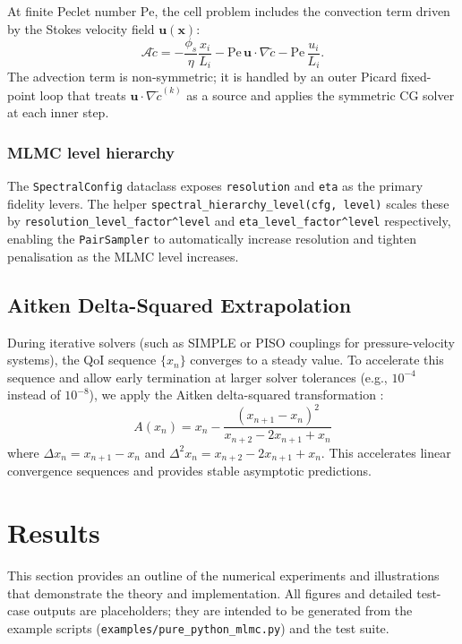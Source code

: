 \documentclass[preprint,12pt]{elsarticle}
\newcommand{\x}{\mathbf{x}}
\newcommand{\bfu}{\mathbf{u}}
\begin{document}
At finite Peclet number $\mathrm{Pe}$, the cell problem includes the
convection term driven by the Stokes velocity field $\bfu(\x)$:
\begin{equation}
  \mathcal{A}\tilde{c} = -\frac{\phi_s}{\eta}\frac{x_i}{L_i}
    - \mathrm{Pe}\,\bfu\cdot\nabla\tilde{c}
    - \mathrm{Pe}\,\frac{u_i}{L_i}.
\end{equation}
The advection term is non-symmetric; it is handled by an outer Picard
fixed-point loop that treats $\bfu\cdot\nabla\tilde{c}^{(k)}$ as a source
and applies the symmetric CG solver at each inner step.

\subsubsection*{MLMC level hierarchy}

The \texttt{SpectralConfig} dataclass exposes \texttt{resolution} and
\texttt{eta} as the primary fidelity levers. The helper
\texttt{spectral\_hierarchy\_level(cfg, level)} scales these by
\texttt{resolution\_level\_factor\^{}level} and
\texttt{eta\_level\_factor\^{}level} respectively, enabling the
\texttt{PairSampler} to automatically increase resolution and tighten
penalisation as the MLMC level increases.

\subsection{Aitken Delta-Squared Extrapolation}
During iterative solvers (such as SIMPLE or PISO couplings for pressure-velocity systems), the QoI sequence $\{x_n\}$ converges to a steady value. To accelerate this sequence and allow early termination at larger solver tolerances (e.g., $10^{-4}$ instead of $10^{-8}$), we apply the Aitken delta-squared transformation \citep{brezinski1996extrapolation}:
\begin{equation}
\label{eq:aitken_extrap}
A(x_n) = x_n - \frac{(x_{n+1} - x_n)^2}{x_{n+2} - 2x_{n+1} + x_n}
\end{equation}
where $\Delta x_n = x_{n+1} - x_n$ and $\Delta^2 x_n = x_{n+2} - 2x_{n+1} + x_n$. This accelerates linear convergence sequences and provides stable asymptotic predictions.

\section{Results}
\label{sec:results}

This section provides an outline of the numerical experiments and illustrations that demonstrate the theory and implementation. All figures and detailed test-case outputs are placeholders; they are intended to be generated from the example scripts (\texttt{examples/pure\_python\_mlmc.py}) and the test suite.
\end{document}
